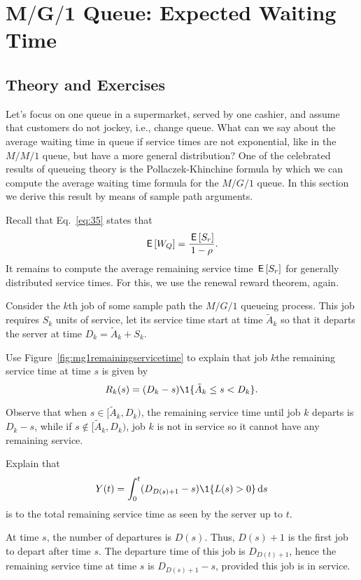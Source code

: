 \section
[$M/G/1$ Queue: Expected Waiting Time]
{$\mathbf{M/G/1}$ Queue: Expected Waiting Time}
\label{sec:mg1}


\subsection*{Theory and Exercises}



Let's focus on one queue in a supermarket, served by one cashier, and
assume that customers do not jockey, i.e., change queue. What can we
say about the average waiting time in queue if service times are not
exponential, like in the $M/M/1$ queue, but have a more general
distribution? One of the celebrated results of queueing theory is the
Pollaczek-Khinchine formula by which we can compute the average
waiting time formula for the $M/G/1$ queue. In this section we derive
this result by means of sample path arguments.

Recall that Eq.~\eqref{eq:35} states that
\begin{equation*}
  \,\mathsf{E}\left[W_Q\right] = \frac{\,\mathsf{E}\left[S_r\right]}{1-\rho}.
\end{equation*}
It remains to compute the average remaining service time $\,\mathsf{E}\left[S_r\right]$ for generally distributed service times. For this, we use the renewal reward theorem, again.


Consider the $k$th job of some sample path the $M/G/1$ queueing process.
This job requires $S_k$ units of service, let its service time start at time $\tilde A_k$ so that it departs the server at time $D_k=\tilde A_k + S_k$. 
\begin{exercise}{\faFlask}
Use  Figure~\ref{fig:mg1remainingservicetime} to explain that job $k$the remaining service time at time $s$ is given by
\begin{equation*}
R_k(s) = (D_k-s)\1{\tilde A_k \leq s < D_k}.
\end{equation*}
\begin{solution}
Observe that when $s\in [\tilde A_k, D_k)$, the remaining service
time until job $k$ departs is $D_k-s $, while if
$s\not \in [\tilde A_k, D_k)$, job $k$ is not in service so it cannot have
any remaining service.
\end{solution}
\end{exercise}

\begin{exercise}[\faFlask]
  Explain that
  \begin{equation*}
    Y(t) = \int_0^t (D_{D(s)+1}-s)\1{L(s) > 0} \d s
  \end{equation*}
is to the total remaining service time as seen by the server up to $t$. 
\begin{solution}
  At time $s$, the number of departures is $D(s)$. Thus, $D(s)+1$ is the first job to depart after time $s$. The departure time of this job is $D_{D(t)+1}$, hence the remaining service time at time $s$ is $D_{D(s)+1}-s$, provided this job is in service. 
\end{solution}
\end{exercise}

